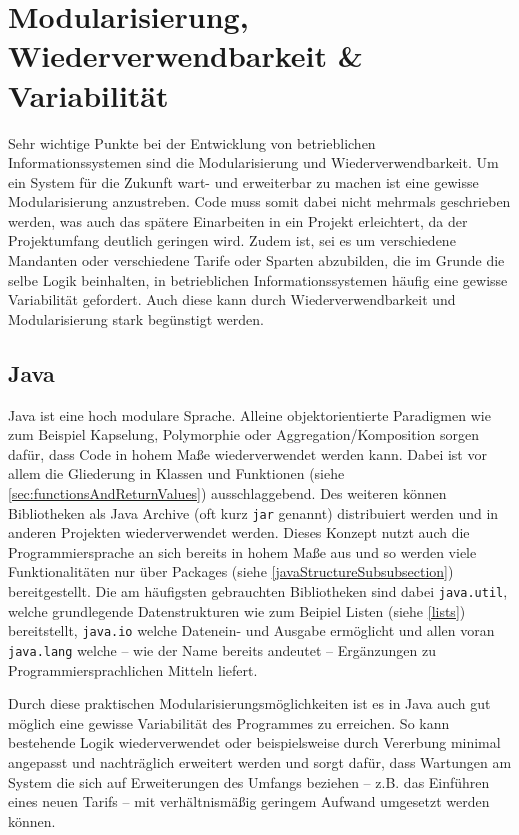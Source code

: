 \section{Modularisierung, Wiederverwendbarkeit \& Variabilität}
Sehr wichtige Punkte bei der Entwicklung von betrieblichen Informationssystemen sind die Modularisierung und Wiederverwendbarkeit. Um ein System für die Zukunft wart- und erweiterbar zu machen ist eine gewisse Modularisierung anzustreben. Code muss somit dabei nicht mehrmals geschrieben werden, was auch das spätere Einarbeiten in ein Projekt erleichtert, da der Projektumfang deutlich geringen wird. Zudem ist, sei es um verschiedene Mandanten oder verschiedene Tarife oder Sparten abzubilden, die im Grunde die selbe Logik beinhalten, in betrieblichen Informationssystemen häufig eine gewisse Variabilität gefordert. Auch diese kann durch Wiederverwendbarkeit und Modularisierung stark begünstigt werden.

\subsection*{Java}
Java ist eine hoch modulare Sprache. Alleine objektorientierte Paradigmen wie zum Beispiel Kapselung, Polymorphie oder Aggregation/Komposition sorgen dafür, dass Code in hohem Maße wiederverwendet werden kann. Dabei ist vor allem die Gliederung in Klassen und Funktionen (siehe \autoref{sec:functionsAndReturnValues}) ausschlaggebend. Des weiteren können Bibliotheken als Java Archive (oft kurz \texttt{jar} genannt) dis­tri­bu­ie­rt werden und in anderen Projekten wiederverwendet werden. Dieses Konzept nutzt auch die Programmiersprache an sich bereits in hohem Maße aus und so werden viele Funktionalitäten nur über Packages (siehe \autoref{javaStructureSubsubsection}) bereitgestellt. Die am häufigsten gebrauchten Bibliotheken sind dabei \texttt{java.util}, welche grundlegende Datenstrukturen wie zum Beipiel Listen (siehe \autoref{lists}) bereitstellt, \texttt{java.io} welche Datenein- und Ausgabe ermöglicht und allen voran \texttt{java.lang} welche -- wie der Name bereits andeutet -- Ergänzungen zu Programmiersprachlichen Mitteln liefert. 

Durch diese praktischen Modularisierungsmöglichkeiten ist es in Java auch gut möglich eine gewisse Variabilität des Programmes zu erreichen. So kann bestehende Logik wiederverwendet oder beispielsweise durch Vererbung minimal angepasst und nachträglich erweitert werden und sorgt dafür, dass Wartungen am System die sich auf Erweiterungen des Umfangs beziehen -- z.B. das Einführen eines neuen Tarifs -- mit verhältnismäßig geringem Aufwand umgesetzt werden können.


